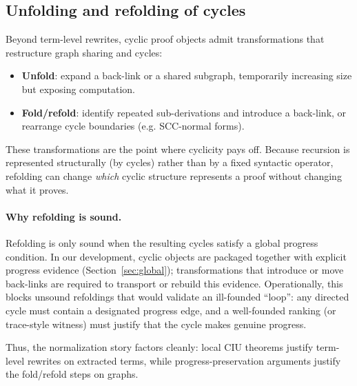 \subsection{Unfolding and refolding of cycles}

Beyond term-level rewrites, cyclic proof objects admit transformations that restructure graph sharing and cycles:
\begin{itemize}
\item \textbf{Unfold}: expand a back-link or a shared subgraph, temporarily increasing size but exposing computation.
\item \textbf{Fold/refold}: identify repeated sub-derivations and introduce a back-link, or rearrange cycle boundaries (e.g. SCC-normal forms).
\end{itemize}

These transformations are the point where cyclicity pays off.
Because recursion is represented structurally (by cycles) rather than by a fixed syntactic operator, refolding can change \emph{which} cyclic structure represents a proof without changing what it proves.

\paragraph{Why refolding is sound.}
Refolding is only sound when the resulting cycles satisfy a global progress condition.
In our development, cyclic objects are packaged together with explicit progress evidence (Section~\ref{sec:global}); transformations that introduce or move back-links are required to transport or rebuild this evidence.
Operationally, this blocks unsound refoldings that would validate an ill-founded ``loop'':
any directed cycle must contain a designated progress edge, and a well-founded ranking (or trace-style witness) must justify that the cycle makes genuine progress.

Thus, the normalization story factors cleanly:
local CIU theorems justify term-level rewrites on extracted terms, while progress-preservation arguments justify the fold/refold steps on graphs.
